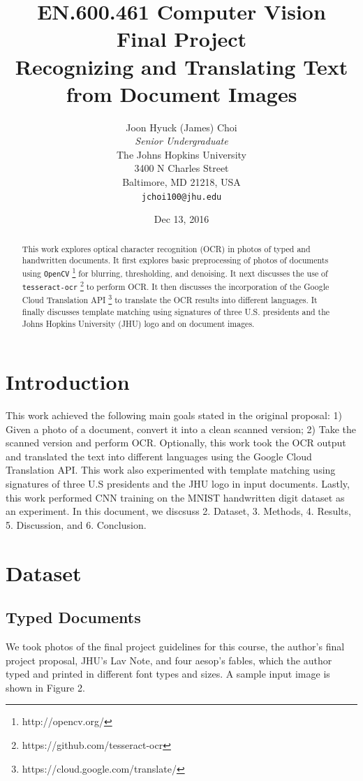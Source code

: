\documentclass[11pt,letterpaper]{article}
\title{EN.600.461 Computer Vision\\Final Project\\Recognizing and Translating Text from Document Images}
\author{Joon Hyuck (James) Choi\\
  \textit{Senior Undergraduate}\\
  The Johns Hopkins University\\
  3400 N Charles Street\\
  Baltimore, MD 21218, USA\\
  {\tt jchoi100@jhu.edu}}
\date{Dec 13, 2016}
\begin{document}
\maketitle
\begin{abstract}
 This work explores optical character recognition (OCR) in photos of typed and handwritten documents. It first explores basic preprocessing of photos of documents using {\tt OpenCV} \footnote{http://opencv.org/} for blurring, thresholding, and denoising. It next discusses the use of {\tt tesseract-ocr} \footnote{https://github.com/tesseract-ocr} to perform OCR. It then discusses the incorporation of the Google Cloud Translation API \footnote{https://cloud.google.com/translate/} to translate the OCR results into different languages. It finally discusses template matching using signatures of three U.S. presidents and the Johns Hopkins University (JHU) logo and on document images. 
\end{abstract}

\section{Introduction}

This work achieved the following main goals stated in the original proposal: 1) Given a photo of a document, convert it into a clean scanned version; 2) Take the scanned version and perform OCR. Optionally, this work took the OCR output and translated the text into different languages using the Google Cloud Translation API. This work also experimented with template matching using signatures of three U.S presidents and the JHU logo in input documents. Lastly, this work performed CNN training on the MNIST handwritten digit dataset as an experiment. In this document, we discsuss 2. Dataset, 3. Methods, 4. Results, 5. Discussion, and 6. Conclusion.

\section{Dataset}

\subsection{Typed Documents}

We took photos of the final project guidelines for this course, the author's final project proposal, JHU's Lav Note, and four aesop's fables, which the author typed and printed in different font types and sizes. A sample input image is shown in Figure 2.
\end{document}
